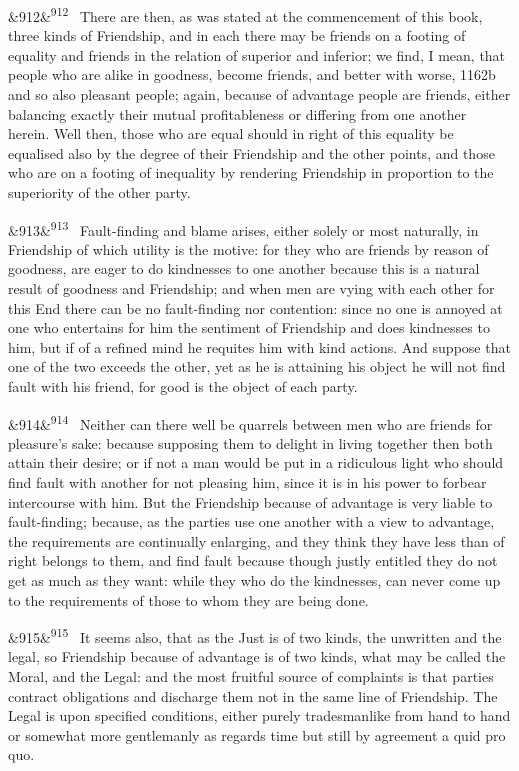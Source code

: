 \documentclass[12pt]{article}
\newcommand{\para}[1][]{\par\noindent\ifx&#1&\else\textsuperscript{\footnotesize #1}~\fi}
\begin{document}
\para[912] There are then, as was stated at the commencement of this book, three kinds of Friendship, and in each there may be friends on a footing of equality and friends in the relation of superior and inferior; we find, I mean, that people who are alike in goodness, become friends, and better with worse, 1162b and so also pleasant people; again, because of advantage people are friends, either balancing exactly their mutual profitableness or differing from one another herein. Well then, those who are equal should in right of this equality be equalised also by the degree of their Friendship and the other points, and those who are on a footing of inequality by rendering Friendship in proportion to the superiority of the other party.

\para[913] Fault-finding and blame arises, either solely or most naturally, in Friendship of which utility is the motive: for they who are friends by reason of goodness, are eager to do kindnesses to one another because this is a natural result of goodness and Friendship; and when men are vying with each other for this End there can be no fault-finding nor contention: since no one is annoyed at one who entertains for him the sentiment of Friendship and does kindnesses to him, but if of a refined mind he requites him with kind actions. And suppose that one of the two exceeds the other, yet as he is attaining his object he will not find fault with his friend, for good is the object of each party.

\para[914] Neither can there well be quarrels between men who are friends for pleasure's sake: because supposing them to delight in living together then both attain their desire; or if not a man would be put in a ridiculous light who should find fault with another for not pleasing him, since it is in his power to forbear intercourse with him. But the Friendship because of advantage is very liable to fault-finding; because, as the parties use one another with a view to advantage, the requirements are continually enlarging, and they think they have less than of right belongs to them, and find fault because though justly entitled they do not get as much as they want: while they who do the kindnesses, can never come up to the requirements of those to whom they are being done.

\para[915] It seems also, that as the Just is of two kinds, the unwritten and the legal, so Friendship because of advantage is of two kinds, what may be called the Moral, and the Legal: and the most fruitful source of complaints is that parties contract obligations and discharge them not in the same line of Friendship. The Legal is upon specified conditions, either purely tradesmanlike from hand to hand or somewhat more gentlemanly as regards time but still by agreement a quid pro quo.
\end{document}
